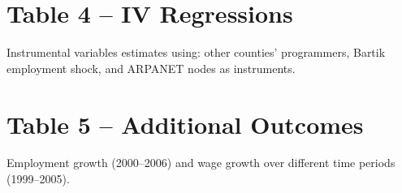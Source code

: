 \documentclass[12pt]{article}
\begin{document}
\section{Table 4 -- IV Regressions}

Instrumental variables estimates using: other counties' programmers,
Bartik employment shock, and ARPANET nodes as instruments.

\vspace{1em}


\clearpage
\section{Table 5 -- Additional Outcomes}

Employment growth (2000--2006) and wage growth over different
time periods (1999--2005).

\vspace{1em}

\end{document}
